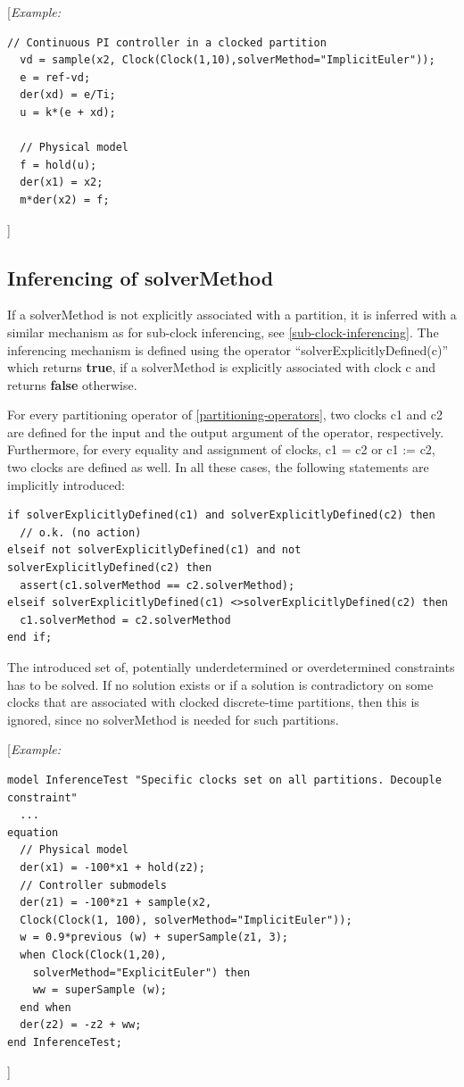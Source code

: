 \documentclass[10pt,a4paper]{report}
\def\doublelabel#1{\label{#1}}
\begin{document}
{[}\emph{Example:}
\begin{lstlisting}[language=modelica]
  // Continuous PI controller in a clocked partition
  vd = sample(x2, Clock(Clock(1,10),solverMethod="ImplicitEuler"));
  e = ref-vd;
  der(xd) = e/Ti;
  u = k*(e + xd);

  // Physical model
  f = hold(u);
  der(x1) = x2;
  m*der(x2) = f;
\end{lstlisting}
{]}

\subsection{Inferencing of solverMethod}\doublelabel{inferencing-of-solvermethod}

If a solverMethod is not explicitly associated with a partition, it is
inferred with a similar mechanism as for sub-clock inferencing, see
\ref{sub-clock-inferencing}. The inferencing mechanism is defined using the operator
``solverExplicitlyDefined(c)'' which returns \textbf{true}, if a
solverMethod is explicitly associated with clock c and returns
\textbf{false} otherwise.

For every partitioning operator of \ref{partitioning-operators}, two clocks c1 and c2
are defined for the input and the output argument of the operator,
respectively. Furthermore, for every equality and assignment of clocks,
c1 = c2 or c1 := c2, two clocks are defined as well. In all these cases,
the following statements are implicitly introduced:

\begin{lstlisting}[language=modelica]
if solverExplicitlyDefined(c1) and solverExplicitlyDefined(c2) then
  // o.k. (no action)
elseif not solverExplicitlyDefined(c1) and not solverExplicitlyDefined(c2) then
  assert(c1.solverMethod == c2.solverMethod);
elseif solverExplicitlyDefined(c1) <>solverExplicitlyDefined(c2) then
  c1.solverMethod = c2.solverMethod
end if;
\end{lstlisting}

The introduced set of, potentially underdetermined or overdetermined
constraints has to be solved. If no solution exists or if a solution is
contradictory on some clocks that are associated with clocked
discrete-time partitions, then this is ignored, since no solverMethod is
needed for such partitions.

{[}\emph{Example:}

\begin{lstlisting}[language=modelica]
model InferenceTest "Specific clocks set on all partitions. Decouple constraint"
  ...
equation 
  // Physical model
  der(x1) = -100*x1 + hold(z2);
  // Controller submodels
  der(z1) = -100*z1 + sample(x2,
  Clock(Clock(1, 100), solverMethod="ImplicitEuler"));
  w = 0.9*previous (w) + superSample(z1, 3);
  when Clock(Clock(1,20),
    solverMethod="ExplicitEuler") then 
    ww = superSample (w);
  end when
  der(z2) = -z2 + ww;
end InferenceTest;
\end{lstlisting}
{]}
\end{document}
